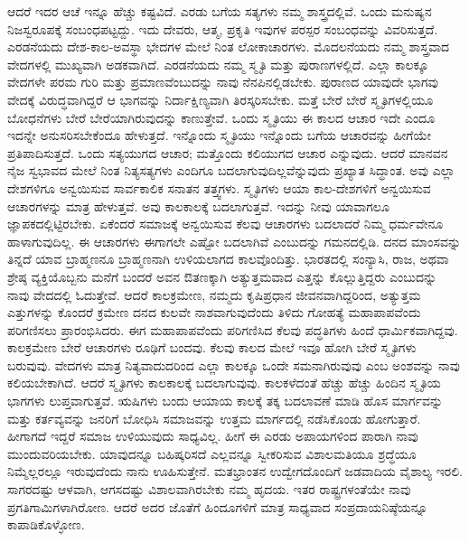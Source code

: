 ಆದರೆ ಇದರ ಆಚೆ ಇನ್ನೂ ಹೆಚ್ಚು ಕಷ್ಟವಿದೆ. ಎರಡು ಬಗೆಯ ಸತ್ಯಗಳು ನಮ್ಮ ಶಾಸ್ತ್ರದಲ್ಲಿವೆ. ಒಂದು ಮನುಷ್ಯನ ನಿಜಸ್ವರೂಪಕ್ಕೆ ಸಂಬಂಧಪಟ್ಟದ್ದು. ಇದು ದೇವರು, ಆತ್ಮ, ಪ್ರಕೃತಿ ಇವುಗಳ ಪರಸ್ಪರ ಸಂಬಂಧವನ್ನು ವಿವರಿಸುತ್ತದೆ. ಎರಡನೆಯದು ದೇಶ-ಕಾಲ-ಅವಸ್ಥಾ ಭೇದಗಳ ಮೇಲೆ ನಿಂತ ಲೋಕಾಚಾರಗಳು. ಮೊದಲನೆಯದು ನಮ್ಮ ಶಾಸ್ತ್ರವಾದ ವೇದಗಳಲ್ಲಿ ಮುಖ್ಯವಾಗಿ ಅಡಕವಾಗಿದೆ. ಎರಡನೆಯದು ನಮ್ಮ ಸ್ಮೃತಿ ಮತ್ತು ಪುರಾಣಗಳಲ್ಲಿದೆ. ಎಲ್ಲಾ ಕಾಲಕ್ಕೂ ವೇದಗಳೇ ಪರಮ ಗುರಿ ಮತ್ತು ಪ್ರಮಾಣವೆಂಬುದನ್ನು ನಾವು ನೆನಪಿನಲ್ಲಿಡಬೇಕು. ಪುರಾಣದ ಯಾವುದೇ ಭಾಗವು ವೇದಕ್ಕೆ ವಿರುದ್ಧವಾಗಿದ್ದರೆ ಆ ಭಾಗವನ್ನು ನಿರ್ದಾಕ್ಷಿಣ್ಯವಾಗಿ ತಿರಸ್ಕರಿಸಬೇಕು. ಮತ್ತೆ ಬೇರೆ ಬೇರೆ ಸ್ಮೃತಿಗಳಲ್ಲಿಯೂ ಬೋಧನೆಗಳು ಬೇರೆ ಬೇರೆಯಾಗಿರುವುದನ್ನು ಕಾಣುತ್ತೇವೆ. ಒಂದು ಸ್ಮೃತಿಯು ಈ ಕಾಲದ ಆಚಾರ ಇದೇ ಎಂದೂ ಇದನ್ನೇ ಅನುಸರಿಸಬೇಕೆಂದೂ ಹೇಳುತ್ತದೆ. ಇನ್ನೊಂದು ಸ್ಮೃತಿಯು ಇನ್ನೊಂದು ಬಗೆಯ ಆಚಾರವನ್ನು ಹೀಗೆಯೇ ಪ್ರತಿಪಾದಿಸುತ್ತದೆ. ಒಂದು ಸತ್ಯಯುಗದ ಆಚಾರ; ಮತ್ತೊಂದು ಕಲಿಯುಗದ ಆಚಾರ ಎನ್ನುವುದು. ಆದರೆ ಮಾನವನ ನೈಜ ಸ್ವಭಾವದ ಮೇಲೆ ನಿಂತ ನಿತ್ಯಸತ್ಯಗಳು ಎಂದಿಗೂ ಬದಲಾಗುವುದಿಲ್ಲವೆನ್ನುವುದು ಪ್ರಖ್ಯಾತ ಸಿದ್ಧಾಂತ. ಅವು ಎಲ್ಲಾ ದೇಶಗಳಿಗೂ ಅನ್ವಯಿಸುವ ಸಾರ್ವಕಾಲಿಕ ಸನಾತನ ತತ್ತ್ವಗಳು. ಸ್ಮೃತಿಗಳು ಆಯಾ ಕಾಲ-ದೇಶಗಳಿಗೆ ಅನ್ವಯಿಸುವ ಆಚಾರಗಳನ್ನು ಮಾತ್ರ ಹೇಳುತ್ತವೆ. ಅವು ಕಾಲಕಾಲಕ್ಕೆ ಬದಲಾಗುತ್ತವೆ. ಇದನ್ನು ನೀವು ಯಾವಾಗಲೂ ಜ್ಞಾಪಕದಲ್ಲಿಟ್ಟಿರಬೇಕು. ಏಕೆಂದರೆ ಸಮಾಜಕ್ಕೆ ಅನ್ವಯಿಸುವ ಕೆಲವು ಆಚಾರಗಳು ಬದಲಾದರೆ ನಿಮ್ಮ ಧರ್ಮವೇನೂ ಹಾಳಾಗುವುದಿಲ್ಲ. ಈ ಆಚಾರಗಳು ಈಗಾಗಲೇ ಎಷ್ಟೋ ಬದಲಾಗಿವೆ ಎಂಬುದನ್ನು ಗಮನದಲ್ಲಿಡಿ. ದನದ ಮಾಂಸವನ್ನು ತಿನ್ನದೆ ಯಾವ ಬ್ರಾಹ್ಮಣನೂ ಬ್ರಾಹ್ಮಣನಾಗಿ ಉಳಿಯಲಾಗದ ಕಾಲವೊಂದಿತ್ತು. ಭಾರತದಲ್ಲಿ ಸಂನ್ಯಾಸಿ, ರಾಜ, ಅಥವಾ ಶ್ರೇಷ್ಠ ವ್ಯಕ್ತಿಯೊಬ್ಬನು ಮನೆಗೆ ಬಂದರೆ ಅವನ ಔತಣಕ್ಕಾಗಿ ಅತ್ಯುತ್ತಮವಾದ ಎತ್ತನ್ನು ಕೊಲ್ಲುತ್ತಿದ್ದರು ಎಂಬುದನ್ನು ನಾವು ವೇದದಲ್ಲಿ ಓದುತ್ತೇವೆ. ಆದರೆ ಕಾಲಕ್ರಮೇಣ, ನಮ್ಮದು ಕೃಷಿಪ್ರಧಾನ ಜೀವನವಾಗಿದ್ದರಿಂದ, ಅತ್ಯುತ್ತಮ ಎತ್ತುಗಳನ್ನು ಕೊಂದರೆ ಕ್ರಮೇಣ ದನದ ಕುಲವೇ ನಾಶವಾಗುವುದೆಂದು ತಿಳಿದು ಗೋಹತ್ಯೆ ಮಹಾಪಾಪವೆಂದು ಪರಿಗಣಿಸಲು ಪ್ರಾರಂಭಿಸಿದರು. ಈಗ ಮಹಾಪಾಪವೆಂದು ಪರಿಗಣಿಸಿದ ಕೆಲವು ಪದ್ಧತಿಗಳು ಹಿಂದೆ ಧಾರ್ಮಿಕವಾಗಿದ್ದವು. ಕಾಲಕ್ರಮೇಣ ಬೇರೆ ಆಚಾರಗಳು ರೂಢಿಗೆ ಬಂದವು. ಕೆಲವು ಕಾಲದ ಮೇಲೆ ಇವೂ ಹೋಗಿ ಬೇರೆ ಸ್ಮೃತಿಗಳು ಬರುವುವು. ವೇದಗಳು ಮಾತ್ರ ನಿತ್ಯವಾದುದರಿಂದ ಎಲ್ಲಾ ಕಾಲಕ್ಕೂ ಒಂದೇ ಸಮನಾಗಿರುವುವು ಎಂಬ ಅಂಶವನ್ನು ನಾವು ಕಲಿಯಬೇಕಾಗಿದೆ. ಆದರೆ ಸ್ಮೃತಿಗಳು ಕಾಲಕಾಲಕ್ಕೆ ಬದಲಾಗುವುವು. ಕಾಲಕಳೆದಂತೆ ಹೆಚ್ಚು ಹೆಚ್ಚು ಹಿಂದಿನ ಸ್ಮೃತಿಯ ಭಾಗಗಳು ಲುಪ್ತವಾಗುತ್ತವೆ. ಋಷಿಗಳು ಬಂದು ಆಯಾಯ ಕಾಲಕ್ಕೆ ತಕ್ಕ ಬದಲಾವಣೆ ಮಾಡಿ ಹೊಸ ಮಾರ್ಗವನ್ನು ಮತ್ತು ಕರ್ತವ್ಯವನ್ನು ಜನರಿಗೆ ಬೋಧಿಸಿ ಸಮಾಜವನ್ನು ಉತ್ತಮ ಮಾರ್ಗದಲ್ಲಿ ನಡೆಸಿಕೊಂಡು ಹೋಗುತ್ತಾರೆ. ಹೀಗಾಗದೆ ಇದ್ದರೆ ಸಮಾಜ ಉಳಿಯುವುದು ಸಾಧ್ಯವಿಲ್ಲ. ಹೀಗೆ ಈ ಎರಡು ಅಪಾಯಗಳಿಂದ ಪಾರಾಗಿ ನಾವು ಮುಂದುವರಿಯಬೇಕು. ಯಾವುದನ್ನೂ ಬಹಿಷ್ಕರಿಸದೆ ಎಲ್ಲವನ್ನೂ ಸ್ವೀಕರಿಸುವ ವಿಶಾಲಮತಿಯೂ ಶ್ರದ್ಧೆಯೂ ನಿಮ್ಮೆಲ್ಲರಲ್ಲೂ ಇರುವುದೆಂದು ನಾನು ಊಹಿಸುತ್ತೇನೆ. ಮತಭ್ರಾಂತನ ಉದ್ವೇಗದೊಂದಿಗೆ ಜಡವಾದಿಯ ವೈಶಾಲ್ಯ ಇರಲಿ. ಸಾಗರದಷ್ಟು ಆಳವಾಗಿ, ಆಗಸದಷ್ಟು ವಿಶಾಲವಾಗಿರಬೇಕು ನಮ್ಮ ಹೃದಯ. ಇತರ ರಾಷ್ಟ್ರಗಳಂತೆಯೇ ನಾವು ಪ್ರಗತಿಗಾಮಿಗಳಾಗಿರೋಣ. ಆದರೆ ಅದರ ಜೊತೆಗೆ ಹಿಂದೂಗಳಿಗೆ ಮಾತ್ರ ಸಾಧ್ಯವಾದ ಸಂಪ್ರದಾಯನಿಷ್ಠೆಯನ್ನೂ ಕಾಪಾಡಿಕೊಳ್ಳೋಣ.

